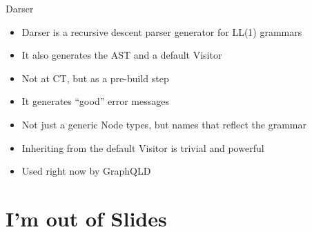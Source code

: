 \documentclass[aspectratio=169,notes]{beamer}
\begin{document}
	\begin{frame}{Darser \hfill\cite{darser}}
		\begin{itemize}
			\item Darser is a recursive descent parser generator for LL(1) grammars
			\item It also generates the AST and a default Visitor
			\item Not at CT, but as a pre-build step\\[1cm]\pause
			\item It generates ``good'' error messages
			\item Not just a generic Node types, but names that reflect the grammar
			\item Inheriting from the default Visitor is trivial and powerful
			\item Used right now by GraphQLD
		\end{itemize}
	\end{frame}

	\section{I'm out of Slides}
\end{document}

